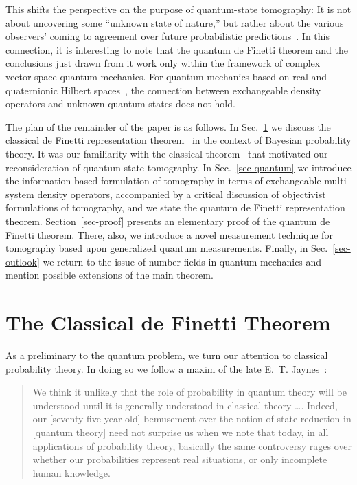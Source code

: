 \documentclass[12pt,aps,eqsecnum]{revtex4-1}
\begin{document}
This shifts the perspective on the purpose of quantum-state
tomography:  It is not about uncovering some ``unknown state of
nature,'' but rather about the various observers' coming to
agreement over future probabilistic predictions~\cite{Fuchs2000b}.
In this connection, it is interesting to note that the quantum de
Finetti theorem and the conclusions just drawn from it work only
within the framework of complex vector-space quantum mechanics.
For quantum mechanics based on real and quaternionic Hilbert
spaces~\cite{Stueckelberg1960,Adler1995}, the connection between
exchangeable density operators and unknown quantum states does
not hold.

The plan of the remainder of the paper is as follows. In
Sec.~\ref{sec-classical} we discuss the classical de Finetti
representation theorem~\cite{DeFinetti1990,Heath1976} in the
context of Bayesian probability theory.  It was our familiarity
with the classical theorem~\cite{Galavotti1989,Jeffrey1997} that
motivated our reconsideration of quantum-state tomography. In
Sec.~\ref{sec-quantum} we introduce the information-based
formulation of tomography in terms of exchangeable multi-system
density operators, accompanied by a critical discussion of
objectivist formulations of tomography, and we state the quantum
de Finetti representation theorem.  Section~\ref{sec-proof}
presents an elementary proof of the quantum de Finetti theorem.
There, also, we introduce a novel measurement technique for
tomography based upon generalized quantum measurements.  Finally,
in Sec.~\ref{sec-outlook} we return to the issue of number fields
in quantum mechanics and mention possible extensions of the main
theorem.

\section{The Classical de Finetti Theorem} \label{sec-classical}

As a preliminary to the quantum problem, we turn our attention to
classical probability theory.   In doing so we follow a maxim of
the late E.~T. Jaynes~\cite{Jaynes1986b}:
\begin{quote}
We think it unlikely that the role of probability in quantum theory
will be understood until it is generally understood in classical theory
\ldots.  Indeed, our [seventy-five-year-old] bemusement over the
notion of state reduction in [quantum theory] need not surprise us
when we note that today, in all applications of probability theory,
basically the same controversy rages over whether our probabilities
represent real situations, or only incomplete human knowledge.
\end{quote}
\end{document}
